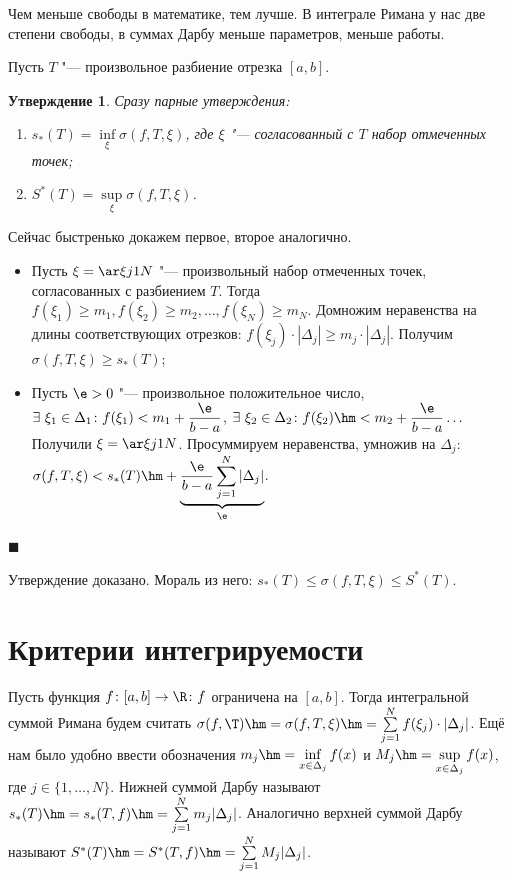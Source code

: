 \documentclass[a4paper,10pt,twoside]{article}
\newtheorem{Ut}{Утверждение}[section]
\newenvironment{Proof}
       {\par\noindent{\textbf{Доказательство.}}}
       {\hfill$\scriptstyle\blacksquare$}
\let\AVsection\section{}
\renewcommand\section{\newpage\scol\AVsection}
\newcommand{\scol}{  \renewcommand{\headrulewidth}{0.5pt}\fancyhead[RE,LO]{\thesection{} \leftmark} \fancyhead[LE,RO]{\thepage}}
\begin{document}
 Чем меньше свободы в математике, тем лучше. В интеграле Римана у нас две степени свободы, в суммах Дарбу меньше параметров, меньше работы.
 
 Пусть $T$ "--- произвольное разбиение отрезка $[a,b]$.
 
 \begin{Ut}
 	Сразу парные утверждения:
 	
 	\begin{enumerate}
 	  \item $s_*(T)=\inf\limits_{\xi}\sigma(f,T,\xi)$, где $\xi$ "--- согласованный с $T$ набор отмеченных точек;
 	  \item $S^*(T)=\sup\limits_{\xi}\sigma(f,T,\xi)$.
 	\end{enumerate}
 \end{Ut}
 
 \begin{Proof}
 	Сейчас быстренько докажем первое, второе аналогично.
 	\begin{itemize}
 	  \item Пусть $\xi=\ar\xi j1N$ "--- произвольный набор отмеченных точек, согласованных с разбиением $T$.
 	  Тогда $f(\xi_1)\geq m_1,f(\xi_2)\geq m_2,\ldots,f(\xi_N)\geq m_N$. Домножим неравенства на длины соответствующих отрезков:
 	  $f(\xi_j)\cdot|\Delta_j|\geq m_j\cdot|\Delta_j|$. Получим $\sigma(f,T,\xi)\geq s_*(T)$;
 	  \item Пусть $\e>0$ "--- произвольное положительное число, $\exists\ \xi_1\in\Delta_1\colon f(\xi_1)<m_1+\dfrac{\e}{b-a}$,
 	  $\exists\ \xi_2\in\Delta_2\colon f(\xi_2)\hm<m_2+\dfrac{\e}{b-a}\ldots$ Получили $\xi=\ar\xi j1N$.
 	  Просуммируем неравенства, умножив на $\Delta_j$: $\sigma(f,T,\xi)<s_*(T)\hm+\underbrace{\dfrac{\e}{b-a}\sum\limits_{j=1}^N|\Delta_j|}_{\e}$.
 	\end{itemize}\end{Proof}
 
 Утверждение доказано. Мораль из него: $s_*(T)\leq\sigma(f,T,\xi)\leq S^*(T)$.
 
 \section{Критерии интегрируемости}
 
 Пусть функция $f\colon [a,b]\to\R\colon f$ ограничена на $[a,b]$. Тогда интегральной суммой Римана будем считать
 $\sigma(f,\T)\hm=\sigma(f,T,\xi)\hm=\sum\limits_{j=1}^Nf(\xi_j)\cdot|\Delta_j|$. Ещё нам было удобно ввести обозначения
 $m_j\hm=\inf\limits_{x\in\Delta_j}f(x)$ и $M_j\hm=\sup\limits_{x\in\Delta_j}f(x)$, где $j\in\{1,\ldots,N\}$. Нижней суммой Дарбу
 называют $s_*(T)\hm=s_*(T,f)\hm=\sum\limits_{j=1}^Nm_j|\Delta_j|$. Аналогично верхней суммой Дарбу
 называют $S^*(T)\hm=S^*(T,f)\hm=\sum\limits_{j=1}^NM_j|\Delta_j|$.
 
\end{document}
